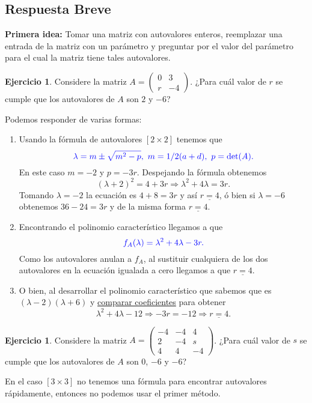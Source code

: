 \documentclass[12pt]{article}
\theoremstyle{plain}
\theoremstyle{definition}
\newtheorem{Ej}[Th]{Ejercicio}         %
\theoremstyle{remark}
\newcommand{\la}{\lambda}           %
\newcommand{\x}{\times}             %
\renewcommand{\:}{\colon}           %
\newcommand{\un}[1]{\underline{#1}}
\renewcommand{\.}{\Cdot}                %
\newcommand{\twobytwo}[4]{\begin{pmatrix} %
    #1 & #2 \\ #3 & #4 \end{pmatrix}}
\newcommand{\threebythree}[9]{\begin{pmatrix} %
  #1 & #2 & #3 \\ #4 & #5 & #6 \\ #7 & #8 & #9 \end{pmatrix}}
\newcommand{\To}{\Rightarrow}
\newcommand{\blu}[1]{\textcolor{blue}{#1}}
\begin{document}
\subsection*{Respuesta Breve}

\textbf{Primera idea:} Tomar una matriz con autovalores enteros, reemplazar una entrada de la matriz con un parámetro y preguntar por el valor del parámetro para el cual la matriz tiene tales autovalores. 

\begin{Ej}
Considere la matriz $A=\twobytwo{0}{3}{r}{-4}$. ¿Para cuál valor de $r$ se cumple que los autovalores de $A$ son $2$ y $-6$?
\end{Ej}

Podemos responder de varias formas:

\begin{enumerate}
  \item Usando la fórmula de autovalores $[2\x 2]$ tenemos que 
  $$\blu{\la=m\pm\sqrt{m^2-p},\ m=1/2(a+d),\ p=\det(A).}$$
  En este caso $m=-2$ y $p=-3r$. Despejando la fórmula obtenemos 
  $$(\la+2)^2=4+3r\To \la^2+4\la=3r.$$
  Tomando $\la=-2$ la ecuación es $4+8=3r$ y así $\un{r=4}$, ó bien si $\la=-6$ obtenemos $36-24=3r$ y de la misma forma $\un{r=4}$.
  \item Encontrando el polinomio característico llegamos a que 
  $$\blu{f_A(\la)=\la^2+4\la-3r.}$$
  Como los autovalores anulan a $f_A$, al sustituir cualquiera de los dos autovalores en la ecuación igualada a cero llegamos a que $\un{r=4}$. 
  \item O bien, al desarrollar el polinomio característico que sabemos que es $(\la-2)(\la+6)$ y \un{comparar coeficientes} para obtener
  $$\la^2+4\la-12\To -3r=-12\To \un{r=4}.$$
\end{enumerate}

\begin{Ej}
Considere la matriz $A=\threebythree{-4}{-4}{4}{2}{-4}{s}{4}{4}{-4}$. ¿Para cuál valor de $s$ se cumple que los autovalores de $A$ son $0$, $-6$ y $-6$?
\end{Ej}

En el caso $[3\x 3]$ no tenemos una fórmula para encontrar autovalores rápidamente, entonces no podemos usar el primer método.
\end{document}

